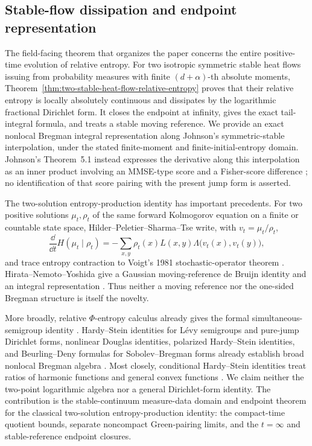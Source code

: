\subsection*{Stable-flow dissipation and endpoint representation}

The field-facing theorem that organizes the paper concerns the entire
positive-time evolution of relative entropy.  For two isotropic symmetric
stable heat flows issuing from probability measures with finite
\((d+\alpha)\)-th absolute moments,
Theorem~\ref{thm:two-stable-heat-flow-relative-entropy} proves that their
relative entropy is locally absolutely continuous and dissipates by the
logarithmic fractional Dirichlet form.  It closes the endpoint at infinity,
gives the exact tail-integral formula, and treats a stable moving reference.
We provide an exact nonlocal Bregman integral representation along Johnson's
symmetric-stable interpolation, under the stated finite-moment and
finite-initial-entropy domain.  Johnson's Theorem~5.1 instead expresses the
derivative along this interpolation as an inner product involving an
MMSE-type score and a Fisher-score difference
\cite{Johnson2013StableDeBruijn}; no identification of that score pairing
with the present jump form is asserted.

The two-solution entropy-production identity has important precedents.  For
two positive solutions \(\mu_t,\rho_t\) of the same forward Kolmogorov
equation on a finite or countable state space, Hilder--Peletier--Sharma--Tse
write, with \(v_t=\mu_t/\rho_t\),
\[
 \frac{\dd}{\dd t}H(\mu_t\mid\rho_t)
 =-\sum_{x,y}\rho_t(x)L(x,y)
 \Lambda\bigl(v_t(x),v_t(y)\bigr),
\]
and trace entropy contraction to Voigt's 1981 stochastic-operator theorem
\cite{HilderPeletierSharmaTse2020EntropyDistance,
Voigt1981StochasticOperators}.  Hirata--Nemoto--Yoshida give a Gaussian
moving-reference de Bruijn identity and an integral representation
\cite{HirataNemotoYoshida2012IntegralRepresentation}.  Thus neither a moving
reference nor the one-sided Bregman structure is itself the novelty.

More broadly, relative \(\Phi\)-entropy calculus already gives the formal
simultaneous-semigroup identity \cite{Chafai2004PhiEntropies}.  Hardy--Stein
identities for L\'evy semigroups and pure-jump Dirichlet forms, nonlinear
Douglas identities, polarized Hardy--Stein identities, and Beurling--Deny
formulas for Sobolev--Bregman forms already establish broad nonlocal Bregman
algebra
\cite{BanuelosBogdanLuks2016HardyStein,
BogdanGrzywnyPietruskaPalubaRutkowski2023NonlinearNonlocalDouglas,
Gutowski2023HardySteinPureJump,
BogdanGutowskiPietruskaPaluba2025PolarizedHardyStein,
GutowskiKwasnicki2025BeurlingDenySobolevBregman}.  Most closely, conditional
Hardy--Stein identities treat ratios of harmonic functions and general
convex functions \cite{KlimsiakRozkosz2025ConditionalHardyStein}.  We claim
neither the two-point logarithmic algebra nor a general Dirichlet-form
identity.  The contribution is the stable-continuum measure-data domain and
endpoint theorem for the classical two-solution entropy-production identity:
the compact-time quotient bounds, separate noncompact Green-pairing limits,
and the \(t=\infty\) and stable-reference endpoint closures.

